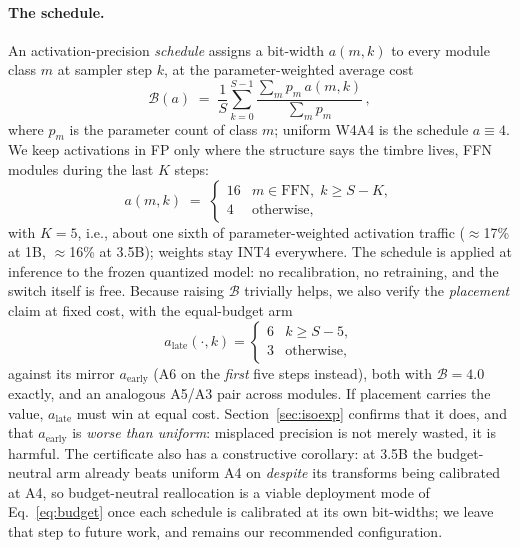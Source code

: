 \paragraph{The  schedule.}
An activation-precision \emph{schedule} assigns a bit-width $a(m,k)$ to every module class $m$ at sampler step $k$, at the parameter-weighted average cost
\begin{equation}
\mathcal{B}(a) \;=\; \frac{1}{S}\sum_{k=0}^{S-1}\frac{\sum_{m} p_m\, a(m,k)}{\sum_{m} p_m}\,,
\label{eq:budget}
\end{equation}
where $p_m$ is the parameter count of class $m$; uniform W4A4 is the schedule $a\equiv 4$. We keep activations in FP only where the structure says the timbre lives, FFN modules during the last $K$ steps:
\begin{equation}
a(m,k) \;=\;
\begin{cases}
16 & m\in\text{FFN},\; k \ge S{-}K,\\[2pt]
4 & \text{otherwise},
\end{cases}
\label{eq:schedule}
\end{equation}
with $K{=}5$, i.e., about one sixth of parameter-weighted activation traffic ($\approx$17\% at 1B, $\approx$16\% at 3.5B); weights stay INT4 everywhere. The schedule is applied at inference to the frozen quantized model: no recalibration, no retraining, and the switch itself is free. Because raising $\mathcal{B}$ trivially helps, we also verify the \emph{placement} claim at fixed cost, with the equal-budget arm
\begin{equation}
a_{\text{late}}(\cdot,k)=
\begin{cases} 6 & k\ge S-5,\\ 3 & \text{otherwise},\end{cases}
\label{eq:iso}
\end{equation}
against its mirror $a_{\text{early}}$ (A6 on the \emph{first} five steps instead), both with $\mathcal{B}=4.0$ exactly, and an analogous A5/A3 pair across modules. If placement carries the value, $a_{\text{late}}$ must win at equal cost. Section~\ref{sec:isoexp} confirms that it does, and that $a_{\text{early}}$ is \emph{worse than uniform}: misplaced precision is not merely wasted, it is harmful. The certificate also has a constructive corollary: at 3.5B the budget-neutral arm already beats uniform A4 on \zh{} \emph{despite} its transforms being calibrated at A4, so budget-neutral reallocation is a viable deployment mode of Eq.~\ref{eq:budget} once each schedule is calibrated at its own bit-widths; we leave that step to future work, and  remains our recommended configuration.
